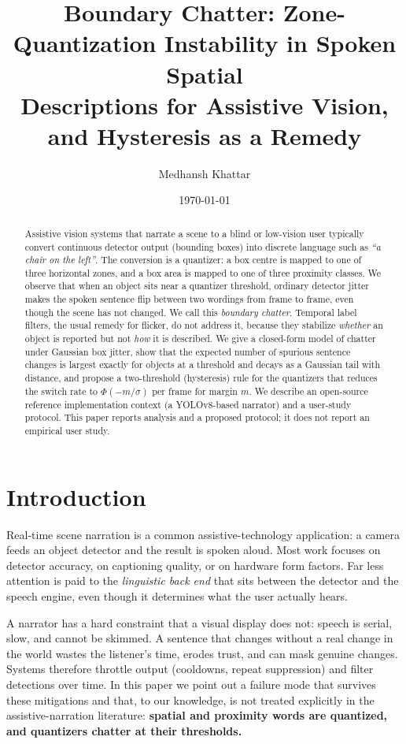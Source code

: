 \documentclass[11pt,a4paper]{article}
\title{Boundary Chatter: Zone-Quantization Instability in Spoken Spatial\\Descriptions for Assistive Vision, and Hysteresis as a Remedy}
\author{Medhansh Khattar}
\date{\today}
\begin{document}
\maketitle

\begin{abstract}
Assistive vision systems that narrate a scene to a blind or low-vision user typically convert continuous detector output (bounding boxes) into discrete language such as \emph{``a chair on the left''}. The conversion is a quantizer: a box centre is mapped to one of three horizontal zones, and a box area is mapped to one of three proximity classes. We observe that when an object sits near a quantizer threshold, ordinary detector jitter makes the spoken sentence flip between two wordings from frame to frame, even though the scene has not changed. We call this \emph{boundary chatter}. Temporal label filters, the usual remedy for flicker, do not address it, because they stabilize \emph{whether} an object is reported but not \emph{how} it is described. We give a closed-form model of chatter under Gaussian box jitter, show that the expected number of spurious sentence changes is largest exactly for objects at a threshold and decays as a Gaussian tail with distance, and propose a two-threshold (hysteresis) rule for the quantizers that reduces the switch rate to $\Phi(-m/\sigma)$ per frame for margin $m$. We describe an open-source reference implementation context (a YOLOv8-based narrator) and a user-study protocol. This paper reports analysis and a proposed protocol; it does not report an empirical user study.
\end{abstract}

\section{Introduction}
Real-time scene narration is a common assistive-technology application: a camera feeds an object detector and the result is spoken aloud. Most work focuses on detector accuracy, on captioning quality, or on hardware form factors. Far less attention is paid to the \emph{linguistic back end} that sits between the detector and the speech engine, even though it determines what the user actually hears.

A narrator has a hard constraint that a visual display does not: speech is serial, slow, and cannot be skimmed. A sentence that changes without a real change in the world wastes the listener's time, erodes trust, and can mask genuine changes. Systems therefore throttle output (cooldowns, repeat suppression) and filter detections over time. In this paper we point out a failure mode that survives these mitigations and that, to our knowledge, is not treated explicitly in the assistive-narration literature: \textbf{spatial and proximity words are quantized, and quantizers chatter at their thresholds.}
\end{document}

